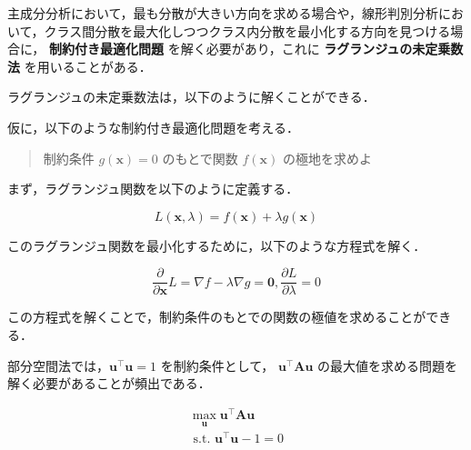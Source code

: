 \documentclass[fleqn, a4paper. 12pt]{jsarticle}
\begin{document}
        主成分分析において，最も分散が大きい方向を求める場合や，線形判別分析において，クラス間分散を最大化しつつクラス内分散を最小化する方向を見つける場合に，
        \textbf{制約付き最適化問題} を解く必要があり，これに \textbf{ラグランジュの未定乗数法} を用いることがある．

        \quad

        ラグランジュの未定乗数法は，以下のように解くことができる．

        仮に，以下のような制約付き最適化問題を考える．

        \begin{quote}
            制約条件
            $g(\boldsymbol{x})=0$
            のもとで関数
            $f(\boldsymbol{x})$ 
            の極地を求めよ
        \end{quote}

        \quad

        まず，ラグランジュ関数を以下のように定義する．

        \begin{equation}
            L(\boldsymbol{x}, \lambda)=f(\boldsymbol{x})+\lambda g(\boldsymbol{x})
        \end{equation}

        このラグランジュ関数を最小化するために，以下のような方程式を解く．

        \begin{equation}
            \frac{\partial}{\partial \boldsymbol{x}} L=\nabla f-\lambda \nabla g=\mathbf{0}, \frac{\partial L}{\partial \lambda}=0
        \end{equation}

        この方程式を解くことで，制約条件のもとでの関数の極値を求めることができる．

        \quad

        部分空間法では，$\boldsymbol{u}^{\top} \boldsymbol{u}=1$ を制約条件として，
        $\boldsymbol{u}^{\top} \mathbf{A} \boldsymbol{u}$ の最大値を求める問題を解く必要があることが頻出である．

        \begin{equation}
            \begin{gathered}
            \max _{\boldsymbol{u}} \boldsymbol{u}^{\top} \mathbf{A} \boldsymbol{u} \\
            \text { s.t. } \boldsymbol{u}^{\top} \boldsymbol{u}-1=0
            \end{gathered}
        \end{equation}
\end{document}
